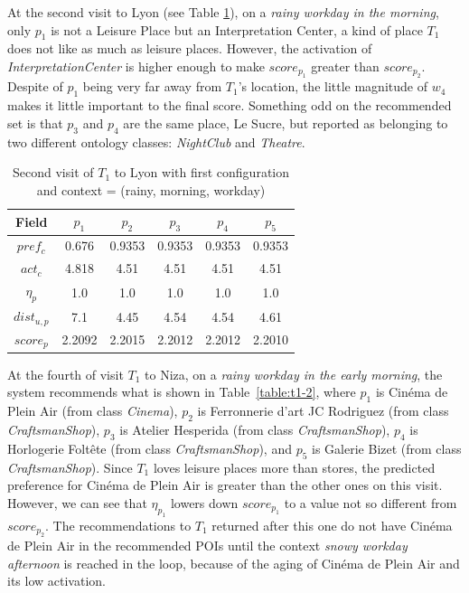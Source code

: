 At the second visit to Lyon (see Table \ref{table:t1-3}), on a {\it rainy workday in the morning}, only $p_1$ is not a Leisure Place but an Interpretation Center, a kind of place $T_1$ does not like as much as leisure places. However, the activation of \textit{InterpretationCenter} is higher enough to make $score_{p_1}$ greater than $score_{p_2}$. Despite of $p_1$ being very far away from $T_1$'s location, the little magnitude of $w_4$ makes it little important to the final score. Something odd on the recommended set is that $p_3$ and $p_4$ are the same place, Le Sucre, but reported as belonging to two different ontology classes: \textit{NightClub} and \textit{Theatre}.

\begin{table}[h!]
\vspace{-0.2cm}
\footnotesize{
    \centering
        \caption{Second visit of $T_1$ to Lyon with first configuration and context = (rainy, morning, workday)}
    \label{table:t1-3}
    \vspace{-0.3cm}
    \begin{tabular}{ |c|c|c|c|c|c| } 
        \hline
        Field   & $p_1$ & $p_2$ & $p_3$ & $p_4$ & $p_5$ \\
        \hline
        $pref_c$    & 0.676 & 0.9353 & 0.9353 & 0.9353 & 0.9353 \\
        $act_c$     & 4.818 & 4.51 & 4.51 & 4.51 & 4.51 \\
        $\eta_p$    & 1.0 & 1.0 & 1.0 & 1.0 & 1.0 \\
        $dist_{u,p}$ & 7.1 & 4.45 & 4.54 & 4.54 & 4.61 \\
        $score_p$    & 2.2092 & 2.2015 & 2.2012 & 2.2012 & 2.2010 \\
        
        \hline
    \end{tabular}
    }
    \vspace{-0.2cm}
\end{table}


At the fourth of  visit  $T_1$ to Niza, on a {\it rainy workday in the early morning}, the system recommends what is shown in Table~\ref{table:t1-2}, where $p_1$ is Cinéma de Plein Air (from class \textit{Cinema}), $p_2$ is Ferronnerie d'art JC Rodriguez (from class \textit{CraftsmanShop}), $p_3$ is Atelier Hesperida (from class \textit{CraftsmanShop}), $p_4$ is Horlogerie Foltête	(from class \textit{CraftsmanShop}), and $p_5$ is Galerie Bizet (from class \textit{CraftsmanShop}). Since $T_1$ loves leisure places more than stores, the predicted preference for Cinéma de Plein Air is greater than the other ones on this visit. However, we can see that $\eta_{p_1}$ lowers down $score_{p_1}$ to a value not so different from $score_{p_2}$. 
The recommendations to $T_1$ returned after this one do not have Cinéma de Plein Air in the recommended POIs until the context {\it snowy workday afternoon} is reached in the loop, because of the aging of Cinéma de Plein Air and its low activation.

